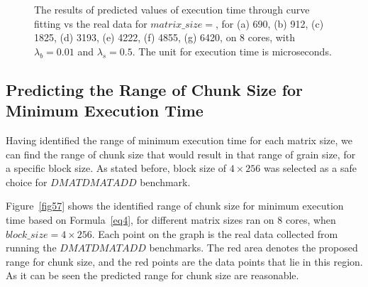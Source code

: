 \begin{figure}[H]
{	\label{fig56:g}}
	\caption{The results of predicted values of execution time through curve fitting vs the real data for $matrix\_size=$, for (a) 690, (b) 912, (c) 1825, (d) 3193, (e) 4222, (f) 4855, (g) 6420, on 8 cores, with $\lambda_{b}=0.01$ and $\lambda_{s}=0.5$. The unit for execution time is microseconds.}
	\label{fig56}	
\end{figure}


\subsection{Predicting the Range of Chunk Size for Minimum Execution Time}
Having identified the range of minimum execution time for each matrix size, we can find the range of chunk size that would result in that range of grain size, for a specific block size.
As stated before, block size of $4\times{256}$ was selected as a safe choice for $DMATDMATADD$ benchmark. 


Figure~\ref{fig57} shows the identified range of chunk size for minimum execution time based on Formula~\ref{eq4}, for different matrix sizes ran on 8 cores, when $block\_{size}=4\times{256}$. Each point on the graph is the real data collected from running the $DMATDMATADD$ benchmarks. The red area denotes the proposed range for chunk size, and the red points are the data points that lie in this region. As it can be seen the predicted range for chunk size are reasonable.   


